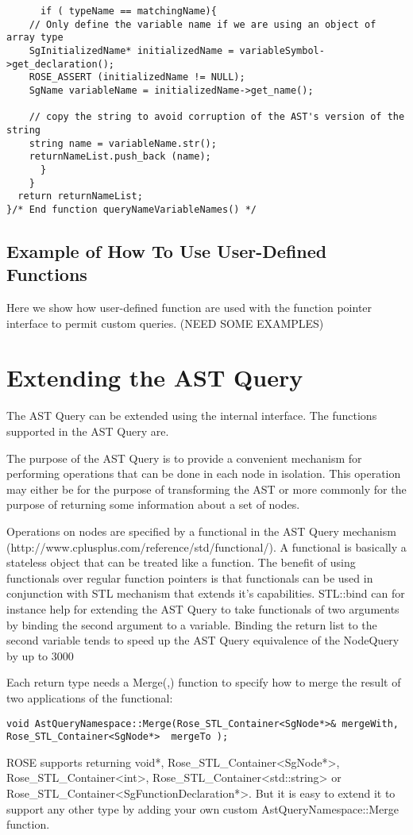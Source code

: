 {\begin{verbatim}
      if ( typeName == matchingName){
	// Only define the variable name if we are using an object of array type
	SgInitializedName* initializedName = variableSymbol->get_declaration();
	ROSE_ASSERT (initializedName != NULL);
	SgName variableName = initializedName->get_name();
	
	// copy the string to avoid corruption of the AST's version of the string
	string name = variableName.str();
	returnNameList.push_back (name);
      }
    }
  return returnNameList;
}/* End function queryNameVariableNames() */
\end{verbatim}

\subsection{Example of How To Use User-Defined Functions}
   Here we show how user-defined function are used with the function pointer interface to
permit custom queries. (NEED SOME EXAMPLES)

}



\section{Extending the AST Query}

The AST Query can be extended using the internal interface. The functions supported
in the AST Query are.

The purpose of the AST Query is to provide a convenient mechanism for performing
operations that can be done in each node in isolation. This operation may either be
for the purpose of transforming the AST or more commonly for the purpose of returning
some information about a set of nodes.

Operations on nodes are specified by a functional in the AST Query mechanism
(http://www.cplusplus.com/reference/std/functional/). A functional is basically a
stateless object that can be treated like a function. The benefit of using functionals
over regular function pointers is that functionals can be used in conjunction with STL
mechanism that extends it's capabilities. STL::bind can for instance help for extending
the AST Query to take functionals of two arguments by binding the second argument to
a variable. Binding the return list to the second variable tends to speed up the AST
Query equivalence of the NodeQuery by up to 3000%


Each return type needs a Merge(,) function to specify how to merge the result
of two applications of the functional:
\begin{verbatim}
void AstQueryNamespace::Merge(Rose_STL_Container<SgNode*>& mergeWith, Rose_STL_Container<SgNode*>  mergeTo );
\end{verbatim}
ROSE supports returning void*, Rose\_STL\_Container<SgNode*>, Rose\_STL\_Container<int>, Rose\_STL\_Container<std::string>
or Rose\_STL\_Container<SgFunctionDeclaration*>. But it is easy to extend it to support any other
type by adding your own custom AstQueryNamespace::Merge function.

